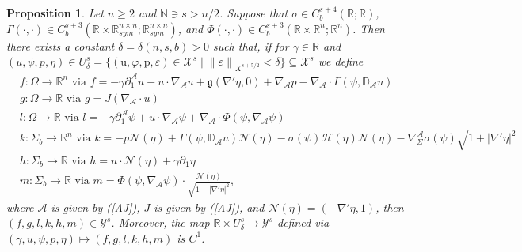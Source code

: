 \documentclass[11pt,letterpaper,reqno]{amsart}
\newtheorem{proposition}[theorem]{Proposition}
\numberwithin{equation}{section}
\newcommand{\abs}[1]{\left\lvert#1\right\rvert}
\newcommand{\norm}[1]{\left\lVert#1\right\rVert}
\begin{document}
\begin{proposition} \label{8.3analog}
    Let \(n \geq 2\) and \(\mathbb{N} \ni s > n/2\). Suppose that \(\sigma\in C_{b}^{s+4}(\mathbb{R};\mathbb{R})\), \(\Gamma(\cdot,\cdot) \in C_{b}^{s+3}(\mathbb{R} \times\mathbb{R}_{sym}^{n \times n};\mathbb{R}_{sym}^{n \times n})\), and \(\Phi(\cdot,\cdot) \in C_{b}^{s+3}(\mathbb{R} \times \mathbb{R}^{n};\mathbb{R}^{n})\). Then there exists a constant \(\delta=\delta(n,s,b)>0\) such that, if for \(\gamma \in \mathbb{R}\) and \((u,\psi,p,\eta) \in U_{\delta}^{s}=\{(\mathrm{u},\varphi,\mathrm{p},\varepsilon) \in \mathcal{X}^{s} \mid \norm{\varepsilon}_{X^{s+5/2}}<\delta\} \subseteq \mathcal{X}^{s}\) we define
    \begin{align}
        &f: \Omega \to \mathbb{R}^{n} \text{ via } f=-\gamma \partial_{1}^{\mathcal{A}}u + u \cdot \nabla_{\mathcal{A}}u+\mathfrak{g}(\nabla'\eta,0) + \nabla_{\mathcal{A}}p-\nabla_{\mathcal{A}}\cdot \Gamma(\psi,\mathbb{D}_{\mathcal{A}}u) \\
        &g: \Omega \to \mathbb{R} \text{ via } g=J (\nabla_{\mathcal{A}} \cdot u) \\
        &l: \Omega \to \mathbb{R} \text{ via } l=-\gamma \partial_{1}^{\mathcal{A}}\psi + u \cdot \nabla_{\mathcal{A}}\psi +\nabla_{\mathcal{A}} \cdot \Phi(\psi,\nabla_{\mathcal{A}}\psi) \\
        &k:\Sigma_{b} \to \mathbb{R}^{n} \text{ via } k=-p\mathcal{N}(\eta)+\Gamma(\psi,\mathbb{D}_{\mathcal{A}}u)\mathcal{N}(\eta)-\sigma(\psi)\mathcal{H}(\eta)\mathcal{N}(\eta)-\nabla_{\Sigma}^{\mathcal{A}}\sigma(\psi)\sqrt{1+\abs{\nabla'\eta}^{2}} \\
        &h: \Sigma_{b} \to \mathbb{R} \text{ via } h=u \cdot \mathcal{N}(\eta)+\gamma \partial_{1}\eta \\
        &m:\Sigma_{b} \to \mathbb{R} \text{ via } m=\Phi(\psi,\nabla_{\mathcal{A}}\psi)\cdot\frac{\mathcal{N}(\eta)}{\sqrt{1+\abs{\nabla'\eta}^{2}}},
    \end{align}
    where \(\mathcal{A}\) is given by (\ref{AJ}), \(J\) is given by (\ref{AJ}), and \(\mathcal{N}(\eta)=(-\nabla'\eta,1)\), then \((f,g,l,k,h,m) \in \mathcal{Y}^{s}\). Moreover, the map \(\mathbb{R} \times U_{\delta}^{s} \to \mathcal{Y}^{s}\) defined via \((\gamma,u,\psi,p,\eta) \mapsto (f,g,l,k,h,m)\) is \(C^{1}\).
\end{proposition}
\end{document}
